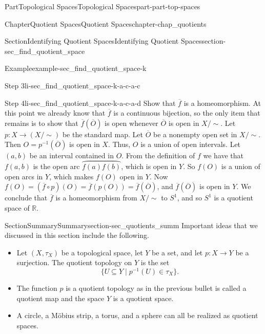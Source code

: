\documentclass[oneside,10pt,]{book}
\numberwithin{equation}{chapter}
\newcommand{\R}{\mathbb{R}}
\newcommand{\ssim}{\sim}
\begin{document}
\begin{partptx}{Part}{Topological Spaces}{}{Topological Spaces}{}{}{part-part-top-spaces}
\begin{chapterptx}{Chapter}{Quotient Spaces}{}{Quotient Spaces}{}{}{chapter-chap_quotients}
\begin{sectionptx}{Section}{Identifying Quotient Spaces}{}{Identifying Quotient Spaces}{}{}{section-sec_find_quotient_space}
\begin{example}{Example}{}{example-sec_find_quotient_space-k}
\begin{descriptionlist}
\begin{dlimedium}{Step 3}{li-sec_find_quotient_space-k-a-c-a-c}
\end{dlimedium}%
\begin{dlimedium}{Step 4}{li-sec_find_quotient_space-k-a-c-a-d}%
Show that \(\overline{f}\) is a homeomorphism. At this point we already know that \(\overline{f}\) is a continuous bijection, so the only item that remains is to show that \(\overline{f}(\overline{O})\) is open whenever \(\overline{O}\) is open in \(X/\ssim\). Let \(p: X \to (X/\ssim)\) be the standard map. Let \(\overline{O}\) be a nonempty open set in \(X/\ssim\). Then \(O = p^{-1}(\overline{O})\) is open in \(X\). Thus, \(O\) is a union of open intervals. Let \((a,b)\) be an interval contained in \(O\). From the definition of \(f\) we have that \(f(a,b)\) is the open arc \(\overparen{f(a)f(b)}\), which is open in \(Y\). So \(f(O)\) is a union of open arcs in \(Y\), which makes \(f(O)\) open in \(Y\). Now \(f(O) = (\overline{f} \circ p)(O) = \overline{f}(p(O)) = \overline{f}(\overline{O})\), and \(\overline{f}(\overline{O})\) is open in \(Y\). We conclude that \(\overline{f}\) is a homeomorphism from \(X/\ssim\) to \(S^1\), and so \(S^1\) is a quotient space of \(\R\).%
\end{dlimedium}%
\end{descriptionlist}
%
\end{example}
\end{sectionptx}
%
%
\typeout{************************************************}
\typeout{************************************************}
%
\begin{sectionptx}{Section}{Summary}{}{Summary}{}{}{section-sec_quotients_summ}
Important ideas that we discussed in this section include the following.%
\begin{itemize}[label=\textbullet]
\item{}Let \((X,\tau_X)\) be a topological space, let \(Y\) be a set, and let \(p: X \to Y\) be a surjection. The quotient topology on \(Y\) is the set%
\begin{equation*}
\{U \subseteq Y \mid p^{-1}(U) \in \tau_X\}\text{.}
\end{equation*}
%
\item{}The function \(p\) is a quotient topology as in the previous bullet is called a quotient map and the space \(Y\) is a quotient space.%
\item{}A circle, a Möbius strip, a torus, and a sphere can all be realized as quotient spaces.%
\end{itemize}
%
\end{sectionptx}
%
%
\typeout{************************************************}

\end{chapterptx}
\end{partptx}
\end{document}
